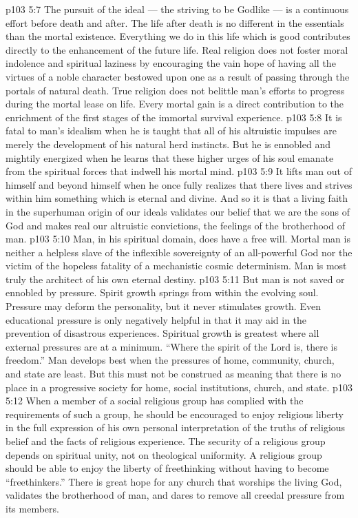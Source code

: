 \vs p103 5:7 \pc The pursuit of the ideal --- the striving to be Godlike --- is a continuous effort before death and after. The life after death is no different in the essentials than the mortal existence. Everything we do in this life which is good contributes directly to the enhancement of the future life. Real religion does not foster moral indolence and spiritual laziness by encouraging the vain hope of having all the virtues of a noble character bestowed upon one as a result of passing through the portals of natural death. True religion does not belittle man’s efforts to progress during the mortal lease on life. Every mortal gain is a direct contribution to the enrichment of the first stages of the immortal survival experience.
\vs p103 5:8 \pc It is fatal to man’s idealism when he is taught that all of his altruistic impulses are merely the development of his natural herd instincts. But he is ennobled and mightily energized when he learns that these higher urges of his soul emanate from the spiritual forces that indwell his mortal mind.
\vs p103 5:9 It lifts man out of himself and beyond himself when he once fully realizes that there lives and strives within him something which is eternal and divine. And so it is that a living faith in the superhuman origin of our ideals validates our belief that we are the sons of God and makes real our altruistic convictions, the feelings of the brotherhood of man.
\vs p103 5:10 Man, in his spiritual domain, does have a free will. Mortal man is neither a helpless slave of the inflexible sovereignty of an all\hyp{}powerful God nor the victim of the hopeless fatality of a mechanistic cosmic determinism. Man is most truly the architect of his own eternal destiny.
\vs p103 5:11 \pc But man is not saved or ennobled by pressure. Spirit growth springs from within the evolving soul. Pressure may deform the personality, but it never stimulates growth. Even educational pressure is only negatively helpful in that it may aid in the prevention of disastrous experiences. Spiritual growth is greatest where all external pressures are at a minimum. “Where the spirit of the Lord is, there is freedom.” Man develops best when the pressures of home, community, church, and state are least. But this must not be construed as meaning that there is no place in a progressive society for home, social institutions, church, and state.
\vs p103 5:12 When a member of a social religious group has complied with the requirements of such a group, he should be encouraged to enjoy religious liberty in the full expression of his own personal interpretation of the truths of religious belief and the facts of religious experience. The security of a religious group depends on spiritual unity, not on theological uniformity. A religious group should be able to enjoy the liberty of freethinking without having to become “freethinkers.” There is great hope for any church that worships the living God, validates the brotherhood of man, and dares to remove all creedal pressure from its members.
